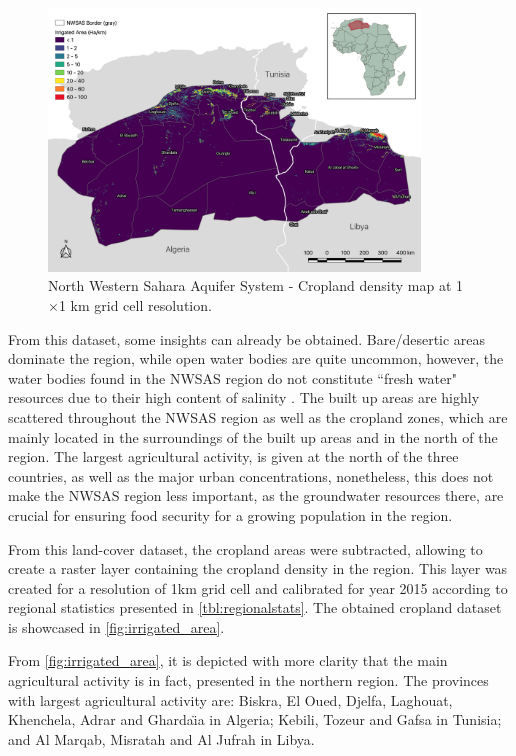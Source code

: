 \documentclass[12pt]{iopart}
\begin{document}
\begin{figure}[!b]
	\centering
	\includegraphics[width=0.88\textwidth, cfbox=black 1pt 0pt]{NWSAS_Irrigated_area}
	\caption[NWSAS cropland density map]{North Western Sahara Aquifer System - Cropland density map at 1$\times$1 km grid cell resolution.}
	\label{fig:irrigated_area}
\end{figure}

From this dataset, some insights can already be obtained. Bare/desertic areas dominate the region, while open water bodies are quite uncommon, however, the water bodies found in the NWSAS region do not constitute ``fresh water" resources due to their high content of salinity \cite{CHAOUKI20131043}. The built up areas are highly scattered throughout the NWSAS region as well as the cropland zones, which are mainly located in the surroundings of the built up areas and in the north of the region. The largest agricultural activity, is given at the north of the three countries, as well as the major urban concentrations, nonetheless, this does not make the NWSAS region less important, as the groundwater resources there, are crucial for ensuring food security for a growing population in the region.

From this land-cover dataset, the cropland areas were subtracted, allowing to create a raster layer containing the cropland density in the region. This layer was created for a resolution of 1km grid cell and calibrated for year 2015 according to regional statistics presented in \autoref{tbl:regionalstats}. The obtained cropland dataset is showcased in \autoref{fig:irrigated_area}.

From \autoref{fig:irrigated_area}, it is depicted with more clarity that the main agricultural activity is in fact, presented in the northern region. The provinces with largest agricultural activity are: Biskra, El Oued, Djelfa, Laghouat, Khenchela, Adrar and Gharda\"\i a in Algeria; Kebili, Tozeur and Gafsa in Tunisia; and Al Marqab, Misratah and Al Jufrah in Libya.
\end{document}
